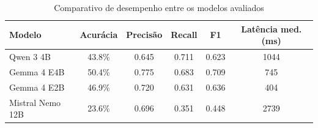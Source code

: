 \begin{table}[htbp!]
\centering
\caption{Comparativo de desempenho entre os modelos avaliados}
\label{tab:resultados_comparativo}
\small
\begin{tabular}{|l|c|c|c|c|c|}
\hline
\textbf{Modelo} & \textbf{Acurácia} & \textbf{Precisão} & \textbf{Recall} & \textbf{F1} & \textbf{Latência med. (ms)} \\
\hline
Qwen 3 4B & 43.8\% & 0.645 & 0.711 & 0.623 & 1044 \\
Gemma 4 E4B & 50.4\% & 0.775 & 0.683 & 0.709 & 745 \\
Gemma 4 E2B & 46.9\% & 0.720 & 0.631 & 0.636 & 404 \\
Mistral Nemo 12B & 23.6\% & 0.696 & 0.351 & 0.448 & 2739 \\
\hline
\end{tabular}
\end{table}
